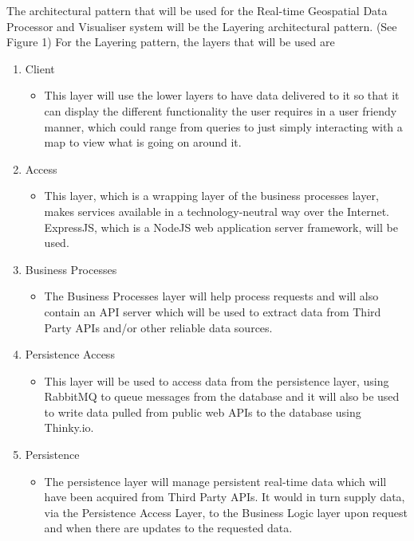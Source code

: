 The architectural pattern that will be used for the Real-time Geospatial Data Processor and Visualiser system will be the Layering architectural pattern. (See Figure 1)\newline
For the Layering pattern, the layers that will be used are
\begin{enumerate}
	\item Client
		\begin{itemize}
			\item This layer will use the lower layers to have data delivered to it so that it can display the different functionality the user requires in a user friendy manner, which could range from queries to just simply interacting with a map to view what is going on around it.
		\end{itemize}
	\item Access
		\begin{itemize}
			\item This layer, which is a wrapping layer of the business processes layer, makes services available in a technology-neutral way over the Internet. ExpressJS, which is a NodeJS web application server framework, will be used.
		\end{itemize}
	\item Business Processes
		\begin{itemize}
			\item The Business Processes layer will help process requests and will also contain an API server which will be used to extract data from Third Party APIs and/or other reliable data sources.
		\end{itemize}
	\item Persistence Access 
		\begin{itemize}
			\item This layer will be used to access data from the persistence layer, using RabbitMQ to queue messages from the database and it will also be used to write data pulled from public web APIs to the database using Thinky.io.
		\end{itemize}
	\item Persistence
		\begin{itemize}
			\item The persistence layer will manage persistent real-time data which will have been acquired from Third Party APIs. It would in turn supply data, via the Persistence Access Layer, to the Business Logic layer upon request and when there are updates to the requested data.
		\end{itemize}
\end{enumerate}


